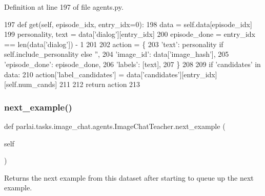 Definition at line 197 of file agents.\+py.


\begin{DoxyCode}
197     \textcolor{keyword}{def }get(self, episode\_idx, entry\_idx=0):
198         data = self.data[episode\_idx]
199         personality, text = data[\textcolor{stringliteral}{'dialog'}][entry\_idx]
200         episode\_done = entry\_idx == len(data[\textcolor{stringliteral}{'dialog'}]) - 1
201 
202         action = \{
203             \textcolor{stringliteral}{'text'}: personality \textcolor{keywordflow}{if} self.include\_personality \textcolor{keywordflow}{else} \textcolor{stringliteral}{''},
204             \textcolor{stringliteral}{'image\_id'}: data[\textcolor{stringliteral}{'image\_hash'}],
205             \textcolor{stringliteral}{'episode\_done'}: episode\_done,
206             \textcolor{stringliteral}{'labels'}: [text],
207         \}
208 
209         \textcolor{keywordflow}{if} \textcolor{stringliteral}{'candidates'} \textcolor{keywordflow}{in} data:
210             action[\textcolor{stringliteral}{'label\_candidates'}] = data[\textcolor{stringliteral}{'candidates'}][entry\_idx][self.num\_cands]
211 
212         \textcolor{keywordflow}{return} action
213 
\end{DoxyCode}
\mbox{\label{classparlai_1_1tasks_1_1image__chat_1_1agents_1_1ImageChatTeacher_a2b795770610618bf94e76705cb90611a}} 
\subsubsection{\texorpdfstring{next\+\_\+example()}{next\_example()}}
{\footnotesize\ttfamily def parlai.\+tasks.\+image\+\_\+chat.\+agents.\+Image\+Chat\+Teacher.\+next\+\_\+example (\begin{DoxyParamCaption}\item[{}]{self }\end{DoxyParamCaption})}

\begin{DoxyVerb}Returns the next example from this dataset after starting to queue up the next
example.
\end{DoxyVerb}
 

